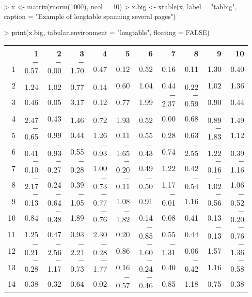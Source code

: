 \documentclass[letterpaper]{article}
\begin{document}
\begin{Schunk}
\begin{Sinput}
> x <- matrix(rnorm(1000), ncol = 10)
> x.big <- xtable(x, label = "tabbig", caption = "Example of longtable spanning several pages")
\end{Sinput}
\end{Schunk}
\begin{Schunk}
\begin{Sinput}
> print(x.big, tabular.environment = "longtable", floating = FALSE)
\end{Sinput}
% latex table generated in R 2.6.0 by xtable 1.5-2 package
% Wed Oct 10 14:26:37 2007
\begin{longtable}{rrrrrrrrrrr}
  \hline
 & 1 & 2 & 3 & 4 & 5 & 6 & 7 & 8 & 9 & 10 \\
  \hline
1 & $-$0.57 & $-$0.00 & $-$1.70 & 0.47 & 0.12 & 0.52 & 0.16 & 0.11 & 1.30 & 0.40 \\
  2 & $-$1.24 & $-$1.02 & $-$0.77 & $-$0.14 & 0.60 & 1.04 & 0.44 & $-$0.22 & 1.02 & 1.36 \\
  3 & 0.46 & 0.05 & 3.17 & 0.12 & 0.77 & 1.99 & $-$2.37 & $-$0.59 & 0.90 & 0.44 \\
  4 & $-$2.47 & 0.43 & $-$1.46 & $-$0.72 & $-$1.93 & $-$0.52 & 0.00 & 0.68 & $-$0.89 & $-$1.49 \\
  5 & $-$0.65 & 0.99 & 0.44 & 1.26 & 0.11 & 0.55 & 0.28 & 0.63 & $-$1.83 & 1.12 \\
  6 & $-$0.41 & $-$0.93 & 0.55 & $-$0.93 & $-$1.65 & $-$0.43 & 0.74 & $-$2.55 & $-$1.22 & $-$0.39 \\
  7 & $-$0.10 & $-$0.27 & $-$0.28 & 1.00 & $-$0.20 & 0.49 & 1.22 & 0.42 & $-$0.16 & $-$1.16 \\
  8 & $-$2.17 & 0.24 & 0.39 & $-$0.73 & $-$0.11 & $-$0.50 & 1.17 & $-$0.54 & $-$1.02 & 1.06 \\
  9 & $-$0.13 & $-$0.64 & $-$1.05 & $-$0.77 & 1.08 & 0.91 & $-$0.01 & 1.16 & $-$0.56 & $-$0.52 \\
  10 & 0.84 & $-$0.38 & 1.89 & $-$0.76 & $-$1.82 & 0.14 & 0.08 & 0.41 & 0.13 & $-$0.20 \\
  11 & 1.25 & 0.47 & 0.93 & 2.30 & 0.20 & $-$0.85 & 0.55 & 0.44 & $-$0.13 & $-$0.76 \\
  12 & $-$0.21 & $-$2.56 & $-$2.21 & $-$0.28 & 0.86 & $-$1.60 & $-$1.31 & 0.06 & 1.57 & $-$1.36 \\
  13 & $-$0.28 & $-$1.17 & $-$0.73 & $-$1.77 & 0.16 & $-$0.24 & 0.40 & $-$0.42 & 1.16 & $-$0.58 \\
  14 & 0.38 & 0.32 & 0.64 & 0.02 & $-$0.57 & $-$0.46 & 0.85 & 1.18 & 0.75 & 0.38 \\

\end{longtable}
\end{Schunk}
\end{document}
